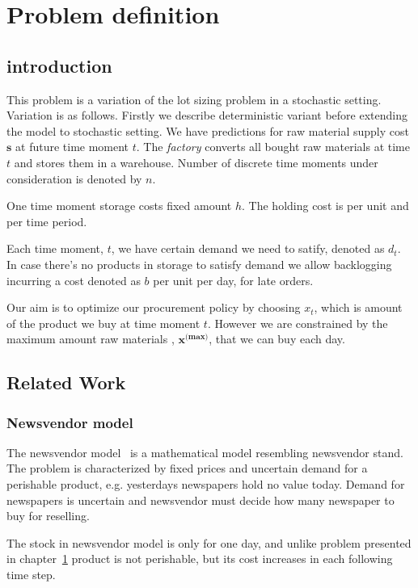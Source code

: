 
\chapter{Problem definition}
\label{chap:prob-def}
\section{introduction}

This problem is a variation of the lot sizing problem in a stochastic setting. Variation is as follows. Firstly we describe deterministic variant before extending the model to stochastic setting. We have predictions for raw material supply cost $\mathbf{s}$ at future time moment $t$. The \emph{factory} converts all bought raw materials at time $t$ and stores them in a warehouse. Number of discrete time moments under consideration is denoted by $n$.

One time moment storage costs fixed amount $h$. The  holding cost is per unit and per time period.

Each time moment, $t$, we have certain demand we need to satify, denoted as $d_t$. In case there's no products in storage to satisfy demand we allow backlogging incurring a cost denoted as $b$ per unit per day, for late orders.

Our aim is to optimize our procurement policy by choosing $x_t$, which is amount of the product we buy at time moment $t$. However we are constrained by the maximum amount raw materials , $\mathbf{x^{\text{(max)}}}$, that we can buy each day.

\section{Related Work}

\subsection{Newsvendor model}
\label{sec:Newsvendor model}

The newsvendor model~\autocite{Arrow1974} is a mathematical model resembling newsvendor stand. The problem is characterized by fixed prices and uncertain demand for a perishable product, e.g. yesterdays newspapers hold no value today. Demand for newspapers is uncertain and newsvendor must decide how many newspaper to buy for reselling.


The stock in newsvendor model is only for one day, and unlike problem presented in chapter~\ref{chap:prob-def} product is not perishable, but its cost increases in each following time step.

